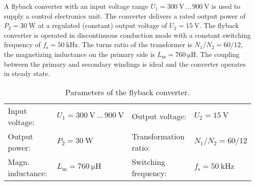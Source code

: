 

A flyback converter with an input voltage range $U_\mathrm{1} = \SI{300}{\volt} \, \dots \, \SI{900}{\volt}$ is used to supply a control electronics unit. The converter delivers a rated output power of  $P_\mathrm{2} = \SI{30}{\watt}$ at a regulated (constant) output voltage of  $U_\mathrm{2} = \SI{15}{\volt}$. The flyback converter is operated in discontinuous conduction  mode with a constant switching frequency of  $f_\mathrm{s} = \SI{50}{\kilo\hertz}$. The turns ratio of the transformer is $N_\mathrm{1}/N_\mathrm{2}=60/12$, the magnetizing inductance on the primary side is $L_\mathrm{m} = \SI{760}{\micro\henry}$. The coupling between the primary and secondary windings is ideal and the converter operates in steady state.



\begin{table}[ht]
    \centering  %
    \begin{tabular}{llll}
        \toprule
        
        Input voltage: &  $U_{\mathrm{1}} = \SI{300}{\volt} \, \dots \, \SI{900}{\volt}$ & Output voltage: & $U_{\mathrm{2}} = \SI{15}{\volt}$ \\ 
        Output power: & $P_2 = \SI{30}{\watt}$  & Transformation ratio: & $N_\mathrm{1}/N_\mathrm{2}=60/12$ \\ 
        Magn. inductance: & $L_\mathrm{m} = \SI{760}{\micro\henry}$ & Switching frequency: & $f_{\mathrm{s}} = \SI{50}{\kilo\hertz}$ \\ 
        \bottomrule
    \end{tabular}
    \caption{Parameters of the flyback converter.}  %
    \label{table:ex04_Parameters of the circuit}
\end{table}


